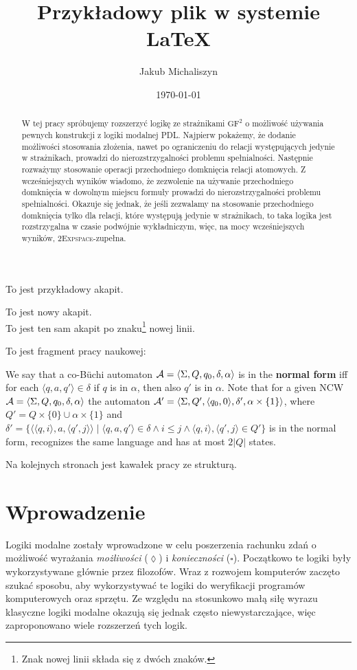 \documentclass[a4paper]{article}
\author{Jakub Michaliszyn}
\title{Przykładowy plik w systemie \LaTeX}
\date{\today}
\begin{document}
\maketitle
To jest przykładowy akapit.

To jest nowy akapit.\\
To jest ten sam akapit po znaku\footnote{Znak nowej linii składa się z dwóch znaków.} nowej linii.

To jest fragment pracy naukowej:
\medskip

We say that a co-B\"uchi automaton ${\cal{A}}=\langle \Sigma , Q, q_0, \delta , \alpha\rangle$ is in the {\bf normal form} iff for each $\langle q, a, q'\rangle \in \delta$ if $q$ is in $\alpha$, then also $q'$ is in $\alpha$. Note that for a given NCW 
${\cal{A}}=\langle \Sigma, Q, q_0, \delta , \alpha\rangle$
the automaton ${\cal{A'}}=\langle \Sigma, Q', \langle q_0, 0\rangle, \delta', \alpha\times\{1\}\rangle$, where 
$Q'=Q\times\{0\} \cup \alpha \times \{1\}$ and 
$\delta'=\{\langle \langle q, i\rangle, a, \langle q', j \rangle\rangle \; | \; \langle q, a, q'\rangle \in \delta \wedge i \leq j 
\wedge  \langle q, i\rangle,\langle q', j \rangle\in Q' \}$ 
is in the normal form, recognizes the same language and has at most $2|Q|$ states.

 

\bigskip

 
 Na kolejnych stronach jest kawałek pracy ze strukturą.
\newpage
 
 \begin{abstract}
 W tej pracy spróbujemy rozszerzyć logikę ze strażnikami $\mathrm{GF^2}$ o możliwość używania pewnych konstrukcji z logiki modalnej PDL. 
 Najpierw pokażemy, że dodanie możliwości stosowania złożenia, nawet po ograniczeniu do relacji występujących jedynie w strażnikach, prowadzi do nierozstrzygalności problemu spełnialności. 
 Następnie rozważymy stosowanie operacji przechodniego domknięcia relacji atomowych. Z wcześniejszych wyników wiadomo, że zezwolenie na używanie przechodniego domknięcia w dowolnym miejscu formuły prowadzi do nierozstrzygalności problemu spełnialności. 
 Okazuje się jednak, że jeśli zezwalamy na stosowanie przechodniego domknięcia tylko dla relacji, które występują jedynie w strażnikach, to taka logika jest rozstrzygalna w czasie podwójnie wykładniczym, więc, na mocy wcześniejszych wyników, \textsc{2Expspace}-zupełna.
\end{abstract}

\section{Wprowadzenie}
Logiki modalne zostały wprowadzone w celu poszerzenia rachunku zdań o możliwość wyrażania \emph{możliwości} ($\lozenge$) i \emph{konieczności} ($\square$). 
Początkowo te logiki były wykorzystywane głównie przez filozofów. 
Wraz z rozwojem komputerów zaczęto szukać sposobu, aby wykorzystywać te logiki do weryfikacji programów komputerowych oraz sprzętu. 
Ze względu na stosunkowo małą siłę wyrazu klasyczne logiki modalne okazują się jednak często niewystarczające, więc zaproponowano wiele rozszerzeń tych logik.
\end{document}
